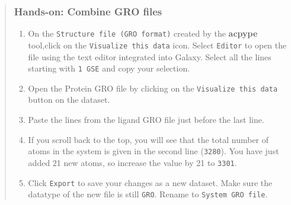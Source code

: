 \documentclass[twocolumn]{bmcart}%
\providecommand{\tightlist}{%
  \setlength{\itemsep}{0pt}\setlength{\parskip}{0pt}}
\providecommand{\tightlist}{%
  \setlength{\itemsep}{0pt}\setlength{\parskip}{0pt}}
\begin{document}
\begin{quote}
\subsubsection{Hands-on: Combine GRO
files}\label{hands-on-combine-gro-files}

\begin{enumerate}
\def\labelenumi{\arabic{enumi}.}
\tightlist
\item
  On the \texttt{Structure\ file\ (GRO\ format)} created by the
  \textbf{acpype} tool,click on the \texttt{Visualize\ this\ data} icon.
  Select \texttt{Editor} to open the file using the text editor
  integrated into Galaxy. Select all the lines starting with
  \texttt{1\ GSE} and copy your selection.
\item
  Open the Protein GRO file by clicking on the
  \texttt{Visualize\ this\ data} button on the dataset.
\item
  Paste the lines from the ligand GRO file just before the last line.
\item
  If you scroll back to the top, you will see that the total number of
  atoms in the system is given in the second line (\texttt{3280}). You
  have just added 21 new atoms, so increase the value by 21 to
  \texttt{3301}.
\item
  Click \texttt{Export} to save your changes as a new dataset. Make sure
  the datatype of the new file is still \texttt{GRO}. Rename to
  \texttt{System\ GRO\ file}.
\end{enumerate}
\end{quote}
\end{document}
